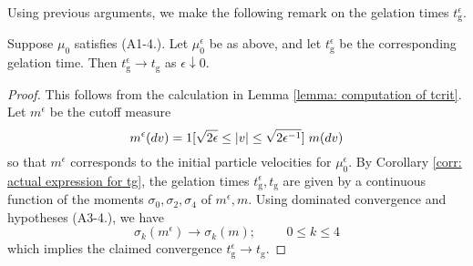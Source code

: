 Using previous arguments, we make the following remark on the gelation times $t^\epsilon_\mathrm{g}$.

\begin{lemma}\label{lemma: continuity of tcrit} Suppose $\mu_0$ satisfies (A1-4.). Let $\mu^\epsilon_0$ be as above, and let $t^\epsilon_\mathrm{g}$ be the corresponding gelation time. Then $t^\epsilon_\mathrm{g}\rightarrow t_\mathrm{g}$ as $\epsilon \downarrow 0$.  \end{lemma}\begin{proof} This follows from the calculation in Lemma \ref{lemma: computation of tcrit}. Let $m^\epsilon$ be the cutoff measure \begin{equation} m^\epsilon(dv)=1[\sqrt{2\epsilon}\le|v|\le\sqrt{2\epsilon^{-1}}]\hspace{0.1cm}m(dv) \end{equation} so that $m^\epsilon$ corresponds to the initial particle velocities for $\mu^\epsilon_0$. By Corollary \ref{corr: actual expression for tg}, the gelation times $t^\epsilon_\mathrm{g}, t_\mathrm{g}$ are given by a continuous function of the moments $\sigma_0, \sigma_2, \sigma_4$ of $m^\epsilon, m$.  Using dominated convergence and hypotheses (A3-4.), we have \begin{equation} \sigma_k(m^\epsilon)\rightarrow \sigma_k(m);\hspace{1cm}0\le k\le 4 \end{equation} which implies the claimed convergence $t^\epsilon_\mathrm{g}\rightarrow t_\mathrm{g}.$ \end{proof}

